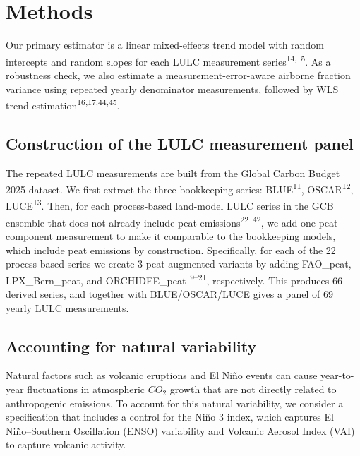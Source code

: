 \documentclass[
  12pt,
  letterpaper,
  DIV=11,
  numbers=noendperiod]{scrartcl}
\begin{document}
\section*{Methods}\label{methods}

Our primary estimator is a linear mixed-effects trend model with random
intercepts and random slopes for each LULC measurement
series\textsuperscript{14,15}. As a robustness check, we also estimate a
measurement-error-aware airborne fraction variance using repeated yearly
denominator measurements, followed by WLS trend
estimation\textsuperscript{16,17,44,45}.

\subsection*{Construction of the LULC measurement
panel}\label{construction-of-the-lulc-measurement-panel}

The repeated LULC measurements are built from the Global Carbon Budget
2025 dataset. We first extract the three bookkeeping series:
BLUE\textsuperscript{11}, OSCAR\textsuperscript{12},
LUCE\textsuperscript{13}. Then, for each process-based land-model LULC
series in the GCB ensemble that does not already include peat
emissions\textsuperscript{22--42}, we add one peat component measurement
to make it comparable to the bookkeeping models, which include peat
emissions by construction. Specifically, for each of the 22
process-based series we create 3 peat-augmented variants by adding
FAO\_peat, LPX\_Bern\_peat, and ORCHIDEE\_peat\textsuperscript{19--21},
respectively. This produces 66 derived series, and together with
BLUE/OSCAR/LUCE gives a panel of 69 yearly LULC measurements.

\subsection*{Accounting for natural
variability}\label{accounting-for-natural-variability}

Natural factors such as volcanic eruptions and El Niño events can cause
year-to-year fluctuations in atmospheric \(CO_2\) growth that are not
directly related to anthropogenic emissions. To account for this natural
variability, we consider a specification that includes a control for the
Niño 3 index, which captures El Niño--Southern Oscillation (ENSO)
variability and Volcanic Aerosol Index (VAI) to capture volcanic
activity.
\end{document}
